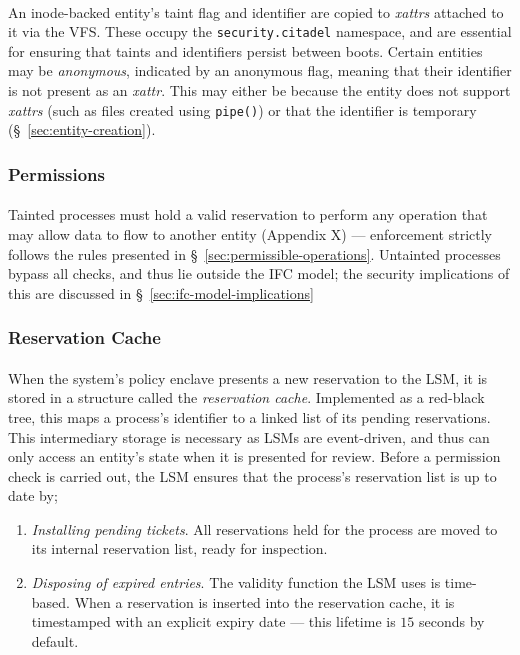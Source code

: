 \paragraph{} An inode-backed entity's taint flag and identifier are copied to \textit{xattrs} attached to it via the VFS. These occupy the \texttt{security.citadel} namespace, and are essential for ensuring that taints and identifiers persist between boots. Certain entities may be \textit{anonymous}, indicated by an anonymous flag, meaning that their identifier is not present as an \textit{xattr}. This may either be because the entity does not support \textit{xattrs} (such as files created using \texttt{pipe()}) or that the identifier is temporary (§~\ref{sec:entity-creation}).


\subsubsection{Permissions} 
\paragraph{} Tainted processes must hold a valid reservation to perform any operation that may allow data to flow to another entity (Appendix X) --- enforcement strictly follows the rules presented in §~\ref{sec:permissible-operations}. Untainted processes bypass all checks, and thus lie outside the IFC model; the security implications of this are discussed in §~\ref{sec:ifc-model-implications}


\subsubsection{Reservation Cache} 
\paragraph{} When the system's policy enclave presents a new reservation to the LSM, it is stored in a structure called the \textit{reservation cache}. Implemented as a red-black tree, this maps a process's identifier to a linked list of its pending reservations. This intermediary storage is necessary as LSMs are event-driven, and thus can only access an entity's state when it is presented for review. Before a permission check is carried out, the LSM ensures that the process's reservation list is up to date by;
\begin{enumerate}
    \item \textit{Installing pending tickets}. All reservations held for the process are moved to its internal reservation list, ready for inspection.
    \item \textit{Disposing of expired entries}. The validity function the LSM uses is time-based. When a reservation is inserted into the reservation cache, it is timestamped with an explicit expiry date --- this lifetime is $15$ seconds by default.  
\end{enumerate}


